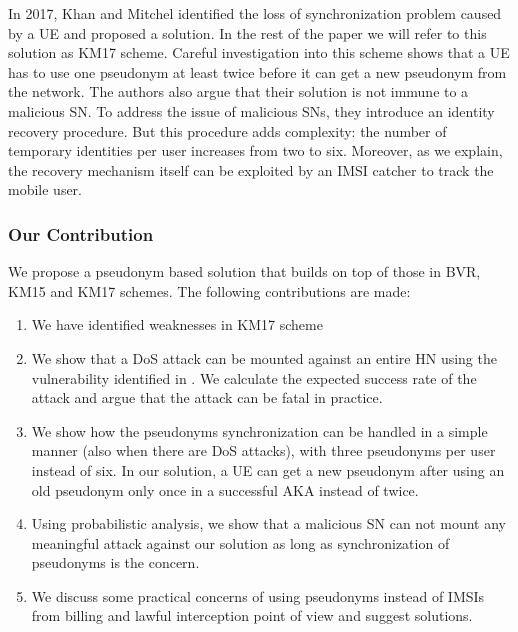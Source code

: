 \documentclass{llncs} %
\begin{document}
In 2017, Khan and Mitchel \cite{wisec17} identified the loss of synchronization problem caused by a UE and proposed a solution. In the rest of the paper we will refer to this solution as KM17 scheme. Careful investigation into this scheme shows that a UE has to use one pseudonym at least twice before it can get a new pseudonym from the network. The authors also argue that their solution is not immune to a malicious SN. To address the issue of malicious SNs, they introduce an identity recovery procedure. But this procedure adds complexity: the number of temporary identities per user increases from two to six. Moreover, as we explain, the recovery mechanism itself can be exploited by an IMSI catcher to track the mobile user.


\subsubsection{Our Contribution}
We propose a pseudonym based solution that builds on top of those in BVR, KM15 and KM17 schemes. The following contributions are made:
\begin{enumerate}
\item We have identified weaknesses in KM17 scheme
\item We show that a DoS attack can be mounted against an entire HN using the vulnerability identified in \cite{wisec17}. We calculate the expected success rate of the attack and argue that the attack can be fatal in practice.
\item We show how the pseudonyms synchronization can be handled in a simple manner (also when there are DoS attacks), with three pseudonyms per user instead of six. In our solution, a UE can get a new pseudonym after using an old pseudonym only once in a successful AKA instead of twice.
\item Using probabilistic analysis, we show that a malicious SN can not mount any meaningful attack against our solution as long as synchronization of pseudonyms is the concern.
\item We discuss some practical concerns of using pseudonyms instead of IMSIs from billing and lawful interception point of view and suggest solutions.
\end{enumerate}
\end{document}
